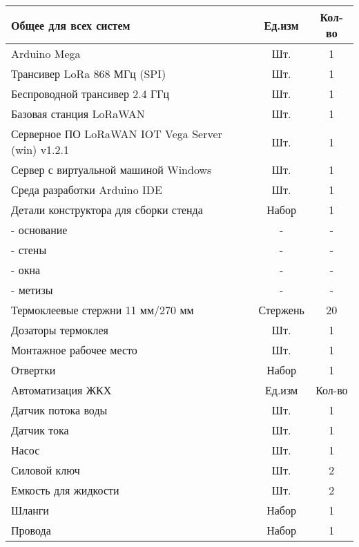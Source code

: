 \begin{longtable}{|p{10cm}|c|c|}
    \hline
    Общее для всех систем & Ед.изм & Кол-во \\
    \hline
    Arduino Mega & Шт. & 1 \\
    Трансивер LoRa 868 МГц (SPI) & Шт. & 1 \\
    Беспроводной трансивер 2.4 ГГц & Шт. & 1  \\
    Базовая станция LoRaWAN & Шт. & 1 \\
    Серверное ПО LoRaWAN IOT Vega Server (win) v1.2.1 & Шт. & 1 \\
    Сервер с виртуальной машиной Windows & Шт. & 1  \\
    Среда разработки Arduino IDE & Шт. & 1 \\
    Детали конструктора для сборки стенда & Набор & 1 \\
    - основание & - & - \\
    - стены	& - & - \\
    - окна & - & - \\
    - метизы & - & - \\
    Термоклеевые стержни 11 мм/270 мм & Стержень & 20 \\
    Дозаторы термоклея & Шт. & 1 \\
    Монтажное рабочее место & Шт. & 1 \\
    Отвертки & Набор & 1 \\ 
    \hline
    \hline
    Автоматизация ЖКХ & Ед.изм & Кол-во	 \\
    \hline
    Датчик потока воды & Шт. & 1 \\
    Датчик тока & Шт. & 1 \\
    Насос & Шт. & 1 \\
    Силовой ключ & Шт. & 2 \\
    Емкость для жидкости & Шт. & 2 \\
    Шланги & Набор & 1 \\
    Провода & Набор & 1 \\ 
    \hline            
\end{longtable}



